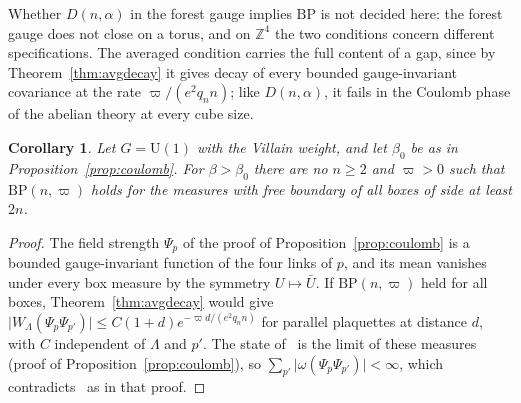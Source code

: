 \documentclass[aps,prd,twocolumn,superscriptaddress,nofootinbib,longbibliography,floatfix,amsmath,amssymb,10pt]{revtex4-2}
\newtheorem{corollary}[theorem]{Corollary}
\theoremstyle{definition}
\theoremstyle{remark}
\newcommand{\Z}{\mathbb{Z}}
\newcommand{\U}{\mathrm{U}}
\begin{document}
Whether $D(n,\alpha)$ in the forest gauge implies $\mathrm{BP}$ is not
decided here: the forest gauge does not close on a torus, and on $\Z^4$ the
two conditions concern different specifications. The averaged condition
carries the full content of a gap, since by Theorem~\ref{thm:avgdecay} it
gives decay of every bounded gauge-invariant covariance at the rate
$\varpi/(e^2q_nn)$; like $D(n,\alpha)$, it fails in the Coulomb phase of the
abelian theory at every cube size.

\begin{corollary}\label{cor:avgcoulomb}
Let $G=\U(1)$ with the Villain weight, and let $\beta_0$ be as in
Proposition~\ref{prop:coulomb}. For $\beta>\beta_0$ there are no $n\ge2$ and
$\varpi>0$ such that $\mathrm{BP}(n,\varpi)$ holds for the measures with
free boundary of all boxes of side at least $2n$.
\end{corollary}

\begin{proof}
The field strength $\Psi_p$ of the proof of Proposition~\ref{prop:coulomb} is
a bounded gauge-invariant function of the four links of $p$, and its mean
vanishes under every box measure by the symmetry $U\mapsto\bar U$. If
$\mathrm{BP}(n,\varpi)$ held for all boxes, Theorem~\ref{thm:avgdecay} would
give $\lvert W_\Lambda(\Psi_p\Psi_{p'})\rvert\le C(1+d)e^{-\varpi d/(e^2q_nn)}$
for parallel plaquettes at distance $d$, with $C$ independent of $\Lambda$
and $p'$. The state of~\cite{FS82} is the limit of these measures (proof of
Proposition~\ref{prop:coulomb}), so $\sum_{p'}\lvert\omega(\Psi_p\Psi_{p'})
\rvert<\infty$, which contradicts~\cite[Sect.~2]{FS82} as in that proof.
\end{proof}
\end{document}
